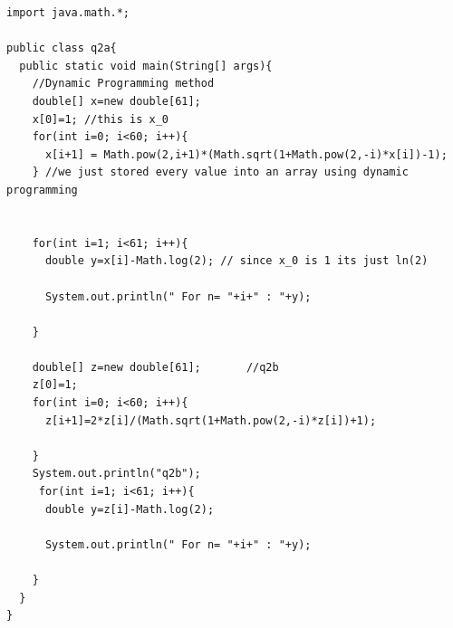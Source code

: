 \documentclass[12pt]{article}
\begin{document}
\begin{lstlisting}
import java.math.*;

public class q2a{
  public static void main(String[] args){
    //Dynamic Programming method
    double[] x=new double[61];
    x[0]=1; //this is x_0
    for(int i=0; i<60; i++){
      x[i+1] = Math.pow(2,i+1)*(Math.sqrt(1+Math.pow(2,-i)*x[i])-1); 
    } //we just stored every value into an array using dynamic programming
    
    
    for(int i=1; i<61; i++){
      double y=x[i]-Math.log(2); // since x_0 is 1 its just ln(2)
      
      System.out.println(" For n= "+i+" : "+y);
      
    }
    
    double[] z=new double[61];       //q2b
    z[0]=1;
    for(int i=0; i<60; i++){
      z[i+1]=2*z[i]/(Math.sqrt(1+Math.pow(2,-i)*z[i])+1); 
      
    }
    System.out.println("q2b");
     for(int i=1; i<61; i++){
      double y=z[i]-Math.log(2);
      
      System.out.println(" For n= "+i+" : "+y);
      
    }
  }
}
\end{lstlisting}
\end{document}
